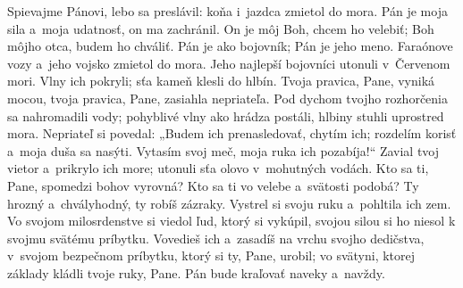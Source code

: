Spievajme Pánovi,
lebo sa preslávil:
koňa i~jazdca zmietol do mora.
\versseparator
Pán je moja sila a~moja udatnosť,
on ma zachránil.
\versseparator
On je môj Boh, chcem ho velebiť;
Boh môjho otca, budem ho chváliť.
\versseparator
Pán je ako bojovník;
Pán je jeho meno.
Faraónove vozy a~jeho vojsko zmietol do mora.
\versseparator
Jeho najlepší bojovníci utonuli v~Červenom mori.
Vlny ich pokryli;
sťa kameň klesli do hlbín.
\versseparator
Tvoja pravica, Pane, vyniká mocou,
tvoja pravica, Pane, zasiahla nepriateľa.
\versseparator
Pod dychom tvojho rozhorčenia sa nahromadili vody;
\versseparator
pohyblivé vlny ako hrádza postáli,
hlbiny stuhli uprostred mora.
\versseparator
Nepriateľ si povedal: „Budem ich prenasledovať, chytím ich;
rozdelím korisť a~moja duša sa nasýti.
\versseparator
Vytasím svoj meč,
moja ruka ich pozabíja!“
\versseparator
Zavial tvoj vietor a~prikrylo ich more;
utonuli sťa olovo v~mohutných vodách.
\versseparator
Kto sa ti, Pane, spomedzi bohov vyrovná?
Kto sa ti vo velebe a~svätosti podobá?
Ty hrozný a~chvályhodný, ty robíš zázraky.
\versseparator
Vystrel si svoju ruku a~pohltila ich zem.
Vo svojom milosrdenstve si viedol ľud, ktorý si vykúpil,
\versseparator
svojou silou si ho niesol
k svojmu svätému príbytku.
\versseparator
Vovedieš ich a~zasadíš na vrchu svojho dedičstva,
v~svojom bezpečnom príbytku, ktorý si ty, Pane, urobil;
\versseparator
vo svätyni, ktorej základy kládli tvoje ruky, Pane.
Pán bude kraľovať naveky a~navždy.